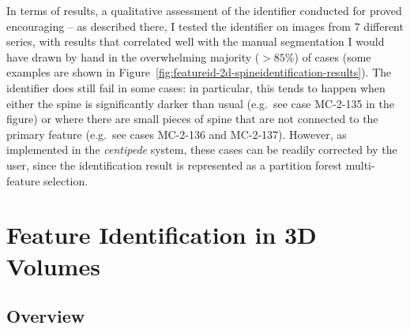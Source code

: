 In terms of results, a qualitative assessment of the identifier conducted for \cite{gvcispa09} proved encouraging -- as described there, I tested the identifier on images from $7$ different series, with results that correlated well with the manual segmentation I would have drawn by hand in the overwhelming majority ($> 85\%$) of cases (some examples are shown in Figure~\ref{fig:featureid-2d-spineidentification-results}). The identifier does still fail in some cases: in particular, this tends to happen when either the spine is significantly darker than usual (e.g.~see case MC-2-135 in the figure) or where there are small pieces of spine that are not connected to the primary feature (e.g.~see cases MC-2-136 and MC-2-137). However, as implemented in the \emph{centipede} system, these cases can be readily corrected by the user, since the identification result is represented as a partition forest multi-feature selection.


\begin{landscape}
\end{landscape}

\afterpage{\clearpage}
\newpage

\section{Feature Identification in 3D Volumes}

\vspace{-.7\baselineskip}

\subsection{Overview}

